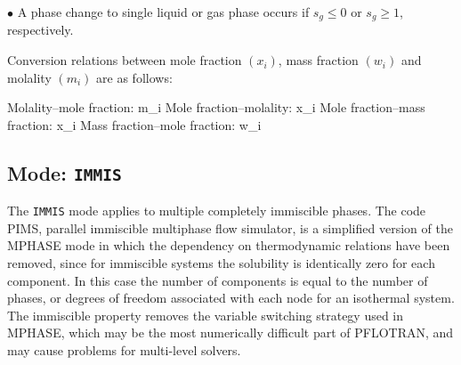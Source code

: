 \noindent
$\bullet$ A phase change to single liquid or gas phase occurs if $s_g \leq 0$ or $s_g\geq 1$, respectively.

Conversion relations between mole fraction $(x_i)$, mass fraction $(w_i)$ and molality $(m_i)$ are as follows:

\noindent
Molality--mole fraction:
\EQ
m_i \eq {} \eq {} \eq {} \eq {}
\EN
Mole fraction--molality:
\EQ
x_i \eq {} \eq {} \eq {} \eq {}
\EN
Mole fraction--mass fraction:
\EQ
x_i \eq {} \eq {} \eq {}
\EN
Mass fraction--mole fraction:
\EQ
w_i \eq {} \eq {} \eq {}
\EN

\subsection{Mode: {\tt IMMIS}}

The {\tt IMMIS} mode applies to multiple completely immiscible phases.
The code PIMS, parallel immiscible multiphase flow simulator, is a simplified version of the  MPHASE mode in which the dependency on thermodynamic relations have been removed, since for immiscible systems the solubility is identically zero for each component. In this case the number of components is equal to the number of phases, or degrees of freedom associated with each node for an isothermal system. The immiscible property removes the variable switching strategy used in MPHASE, which may be the most numerically difficult part of PFLOTRAN, and may cause problems for multi-level solvers. 

